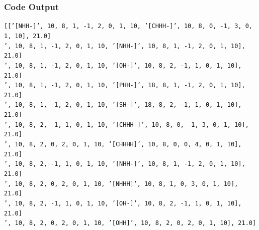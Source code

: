 \documentclass{beamer}
\begin{document}
\begin{frame}
\frametitle{Code Output}
\texttt{\tiny{[['[NHH-]', 10, 8, 1, -1, 2, 0, 1, 10, '[CHHH-]', 10, 8, 0, -1, 3, 0, 1, 10], 21.0]\\
[['[NHH-]', 10, 8, 1, -1, 2, 0, 1, 10, '[NHH-]', 10, 8, 1, -1, 2, 0, 1, 10], 21.0]\\
[['[NHH-]', 10, 8, 1, -1, 2, 0, 1, 10, '[OH-]', 10, 8, 2, -1, 1, 0, 1, 10], 21.0]\\
[['[NHH-]', 10, 8, 1, -1, 2, 0, 1, 10, '[PHH-]', 18, 8, 1, -1, 2, 0, 1, 10], 21.0]\\
[['[NHH-]', 10, 8, 1, -1, 2, 0, 1, 10, '[SH-]', 18, 8, 2, -1, 1, 0, 1, 10], 21.0]\\
[['[OH-]', 10, 8, 2, -1, 1, 0, 1, 10, '[CHHH-]', 10, 8, 0, -1, 3, 0, 1, 10], 21.0]\\
[['[OHH]', 10, 8, 2, 0, 2, 0, 1, 10, '[CHHHH]', 10, 8, 0, 0, 4, 0, 1, 10], 21.0]\\
[['[OH-]', 10, 8, 2, -1, 1, 0, 1, 10, '[NHH-]', 10, 8, 1, -1, 2, 0, 1, 10], 21.0]\\
[['[OHH]', 10, 8, 2, 0, 2, 0, 1, 10, '[NHHH]', 10, 8, 1, 0, 3, 0, 1, 10], 21.0]\\
[['[OH-]', 10, 8, 2, -1, 1, 0, 1, 10, '[OH-]', 10, 8, 2, -1, 1, 0, 1, 10], 21.0]\\
[['[OHH]', 10, 8, 2, 0, 2, 0, 1, 10, '[OHH]', 10, 8, 2, 0, 2, 0, 1, 10], 21.0]\\}}
\end{frame}
\end{document}
